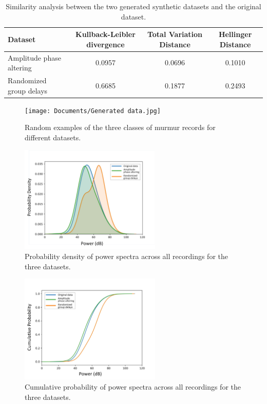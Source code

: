 \documentclass{article}
\begin{document}
\begin{table}
\centering
\caption{Similarity analysis between the two generated synthetic datasets and the original dataset.}
\label{tab:GD}
\begin{tabular}{|l|c|c|c|}
\hline
Dataset                  & Kullback-Leibler divergence                & Total Variation Distance & Hellinger Distance \\ \hline
Amplitude phase altering & 0.0957                                     & 0.0696                   & 0.1010             \\ \hline
Randomized group delays   & 0.6685  & 0.1877                   & 0.2493  \\ \hline 

\end{tabular}
\end{table}

\begin{figure}
\centering
    \texttt{[image: Documents/Generated data.jpg]}
    \caption{Random examples of the three classes of murmur records for different datasets.}
    \label{fig:GD}

\end{figure}


\begin{figure}
\centering
    \includegraphics[width=0.6\textwidth]{Documents/pd.jpg}
    \caption{Probability density of power spectra across all recordings for the three datasets.}
    \label{fig:PD}

\end{figure}


\begin{figure}
\centering
    \includegraphics[width=0.6\textwidth]{Documents/cp.jpg}
    \caption{Cumulative probability of power spectra across all recordings for the three datasets.}
    \label{fig:CP}

\end{figure}
\end{document}
